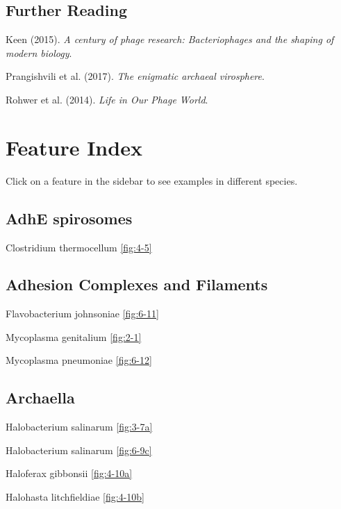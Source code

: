 \documentclass[]{tufte-book}
\begin{document}
\section{Further Reading}\label{further-reading}

Keen (2015). \emph{A century of phage research: Bacteriophages and the
shaping of modern biology}.\citep{keen2015}

Prangishvili et al. (2017). \emph{The enigmatic archaeal
virosphere}.\citep{prangishvili2017}

Rohwer et al. (2014). \emph{Life in Our Phage World}.\citep{rohwer2014}

\appendix


\chapter{Feature Index}\label{feature-index}

Click on a feature in the sidebar to see examples in different species.

\section{\texorpdfstring{\textbf{AdhE
spirosomes}}{AdhE spirosomes}}\label{adhe-spirosomes}

Clostridium thermocellum \ref{fig:4-5}

\section{\texorpdfstring{\textbf{Adhesion Complexes and
Filaments}}{Adhesion Complexes and Filaments}}\label{adhesion-complexes-and-filaments}

Flavobacterium johnsoniae \ref{fig:6-11}

Mycoplasma genitalium \ref{fig:2-1}

Mycoplasma pneumoniae \ref{fig:6-12}

\section{\texorpdfstring{\textbf{Archaella}}{Archaella}}\label{archaella}

Halobacterium salinarum \ref{fig:3-7a}

Halobacterium salinarum \ref{fig:6-9c}

Haloferax gibbonsii \ref{fig:4-10a}

Halohasta litchfieldiae \ref{fig:4-10b}
\end{document}
